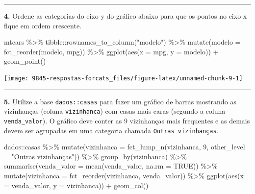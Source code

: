 \documentclass[
]{book}
\newenvironment{Shaded}{\begin{snugshade}}{\end{snugshade}}
\newcommand{\AttributeTok}[1]{\textcolor[rgb]{0.77,0.63,0.00}{#1}}
\newcommand{\ConstantTok}[1]{\textcolor[rgb]{0.00,0.00,0.00}{#1}}
\newcommand{\DecValTok}[1]{\textcolor[rgb]{0.00,0.00,0.81}{#1}}
\newcommand{\FunctionTok}[1]{\textcolor[rgb]{0.00,0.00,0.00}{#1}}
\newcommand{\NormalTok}[1]{#1}
\newcommand{\SpecialCharTok}[1]{\textcolor[rgb]{0.00,0.00,0.00}{#1}}
\newcommand{\StringTok}[1]{\textcolor[rgb]{0.31,0.60,0.02}{#1}}
\begin{document}
\begin{center}\rule{0.5\linewidth}{0.5pt}\end{center}

\textbf{4.} Ordene as categorias do eixo y do gráfico abaixo para que os pontos no eixo x fique em ordem crescente.

\begin{Shaded}
\begin{Highlighting}[]
\NormalTok{mtcars }\SpecialCharTok{\%\textgreater{}\%} 
\NormalTok{  tibble}\SpecialCharTok{::}\FunctionTok{rownames\_to\_column}\NormalTok{(}\StringTok{"modelo"}\NormalTok{) }\SpecialCharTok{\%\textgreater{}\%} 
  \FunctionTok{mutate}\NormalTok{(}\AttributeTok{modelo =} \FunctionTok{fct\_reorder}\NormalTok{(modelo, mpg)) }\SpecialCharTok{\%\textgreater{}\%} 
  \FunctionTok{ggplot}\NormalTok{(}\FunctionTok{aes}\NormalTok{(}\AttributeTok{x =}\NormalTok{ mpg, }\AttributeTok{y =}\NormalTok{ modelo)) }\SpecialCharTok{+}
  \FunctionTok{geom\_point}\NormalTok{()}
\end{Highlighting}
\end{Shaded}

\begin{center}\texttt{[image: 9845-respostas-forcats\_files/figure-latex/unnamed-chunk-9-1]} \end{center}

\begin{center}\rule{0.5\linewidth}{0.5pt}\end{center}

\textbf{5.} Utilize a base \texttt{dados::casas} para fazer um gráfico de barras mostrando as vizinhanças (coluna \texttt{vizinhanca}) com casas mais caras (segundo a coluna \texttt{venda\_valor}). O gráfico deve conter as 9 vizinhanças mais frequentes e as demais devem ser agrupadas em uma categoria chamada \texttt{Outras\ vizinhanças}.

\begin{Shaded}
\begin{Highlighting}[]
\NormalTok{dados}\SpecialCharTok{::}\NormalTok{casas }\SpecialCharTok{\%\textgreater{}\%} 
  \FunctionTok{mutate}\NormalTok{(}\AttributeTok{vizinhanca =} \FunctionTok{fct\_lump\_n}\NormalTok{(vizinhanca, }\DecValTok{9}\NormalTok{, }\AttributeTok{other\_level =} \StringTok{"Outras vizinhanças"}\NormalTok{)) }\SpecialCharTok{\%\textgreater{}\%} 
  \FunctionTok{group\_by}\NormalTok{(vizinhanca) }\SpecialCharTok{\%\textgreater{}\%} 
  \FunctionTok{summarise}\NormalTok{(}\AttributeTok{venda\_valor =} \FunctionTok{mean}\NormalTok{(venda\_valor, }\AttributeTok{na.rm =} \ConstantTok{TRUE}\NormalTok{)) }\SpecialCharTok{\%\textgreater{}\%} 
  \FunctionTok{mutate}\NormalTok{(}\AttributeTok{vizinhanca =} \FunctionTok{fct\_reorder}\NormalTok{(vizinhanca, venda\_valor)) }\SpecialCharTok{\%\textgreater{}\%} 
  \FunctionTok{ggplot}\NormalTok{(}\FunctionTok{aes}\NormalTok{(}\AttributeTok{x =}\NormalTok{ venda\_valor, }\AttributeTok{y =}\NormalTok{ vizinhanca)) }\SpecialCharTok{+}
  \FunctionTok{geom\_col}\NormalTok{()}
\end{Highlighting}
\end{Shaded}
\end{document}
